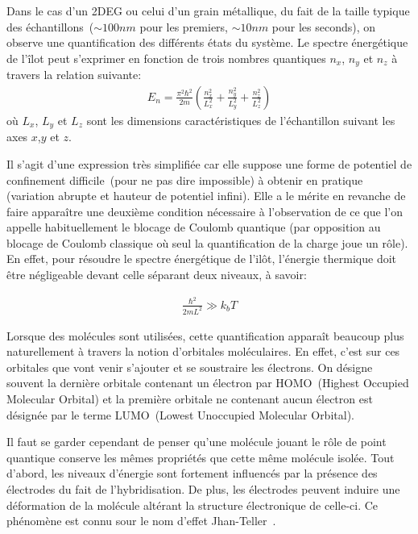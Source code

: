 Dans le cas d'un 2DEG ou celui d'un grain métallique, du fait de la taille typique des échantillons~($\sim 100nm$ pour les premiers, $\sim 10nm$ pour les seconds), on observe une quantification des différents états du système. Le spectre énergétique de l'\^ilot peut s'exprimer en fonction de trois nombres quantiques $n_x$, $n_y$ et $n_z$ à travers la relation suivante:
\begin{eqnarray}
E_n = \frac{\pi^2 \hbar^2}{2m}(\frac{n_x^2}{L_x^2} + \frac{n_y^2}{L_y^2} + \frac{n_z^2}{L_z^2}) \nonumber
\end{eqnarray}
où $L_x$, $L_y$ et $L_z$ sont les dimensions caractéristiques de l'échantillon suivant les axes $x$,$y$ et $z$.

Il s'agit d'une expression très simplifiée car elle suppose une forme de potentiel de confinement difficile~(pour ne pas dire impossible) à obtenir en pratique (variation abrupte et hauteur de potentiel infini). Elle a le mérite en revanche de faire appara\^itre une deuxième condition nécessaire à l'observation de ce que l'on appelle habituellement le blocage de Coulomb quantique (par opposition au blocage de Coulomb classique où seul la quantification de la charge joue un rôle). En effet, pour résoudre le spectre énergétique de l'il\^ot, l'énergie thermique doit \^etre négligeable devant celle séparant deux niveaux, à savoir:

\begin{eqnarray}
\frac{\hbar^2}{2mL^2} \gg k_bT \nonumber
\end{eqnarray}

Lorsque des molécules sont utilisées, cette quantification apparaît beaucoup plus naturellement à travers la notion d'orbitales moléculaires. En effet, c'est sur ces orbitales que vont venir s'ajouter et se soustraire les électrons. On désigne souvent la dernière orbitale contenant un électron par HOMO~(Highest Occupied Molecular Orbital) et la première orbitale ne contenant aucun électron est désignée par le terme LUMO~(Lowest Unoccupied Molecular Orbital).

Il faut se garder cependant de penser qu'une molécule jouant le r\^ole de point quantique conserve les mêmes propriétés que cette m\^eme molécule isolée. Tout d'abord, les niveaux d'énergie sont fortement influencés par la présence des électrodes du fait de l'hybridisation. De plus, les électrodes peuvent induire une déformation de la molécule altérant la structure électronique de celle-ci. Ce phénomène est connu sour le nom d'effet Jhan-Teller~\cite{Jahn1937}. 

